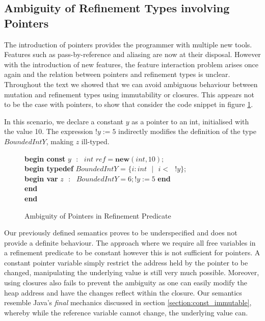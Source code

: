 \documentclass[a4paper,12pt]{report}
\newenvironment{tabs}[1]
 {\flushleft\TabPositions{#1}}
 {\endflushleft}
\begin{document}
\subsection{Ambiguity of Refinement Types involving Pointers}
The introduction of pointers provides the programmer with multiple new tools. 
Features such as pass-by-reference and aliasing are now at their disposal. 
However with the introduction of new features, the feature interaction problem 
arises once again and the relation between pointers and refinement types is 
unclear. Throughout the text we showed that we can avoid ambiguous behaviour 
between mutation and refinement types using immutability or closures. This appears 
not to be the case with pointers, to show that consider the code snippet in figure
\ref{fig:amb_refinement_pointers}. 

\par
In this scenario, we declare a constant $y$ as a pointer to an int, 
initialised with the value 10. The expression $!y := 5$ indirectly modifies 
the definition of the type $BoundedIntY$, making $z$ ill-typed. 

\begin{figure} [H]
  \begin{tabs}{1cm,2cm}
    \textbf{begin const }$y\text{ }:\text{ } int\textit{ ref} = \textbf{new}(int, 10);$\\
    \tab\textbf{begin typedef }$BoundedIntY$ = $\{i : int\text{ }|\text{ }i <\text{ }!y\}$; \\ 
    \tab\tab\textbf{begin var }$z\text{ }:\text{ }BoundedIntY = 6;!y := 5$\textbf { end} \\
    \tab\textbf {end} \\
    \textbf{end}
  \end{tabs}  
  \caption{Ambiguity of Pointers in Refinement Predicate}
  \label{fig:amb_refinement_pointers}
\end{figure}


\par
Our previously defined semantics proves to be underspecified and does not 
provide a definite behaviour. The approach where we require all free variables in a 
refinement predicate to be constant however this is not sufficient for pointers. 
A constant pointer variable simply restrict the address held by the pointer to be 
changed, manipulating the underlying value is still very much possible. 
Moreover, using closures also fails to prevent the ambiguity as one can easily 
modify the heap address and have the changes reflect within the closure. Our  
semantics resemble Java's \textit{final} mechanics discussed in section 
\ref{section:const_immutable}, whereby while the reference variable 
cannot change, the underlying value can.
\end{document}
